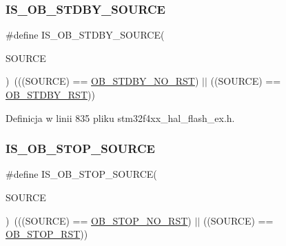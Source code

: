 \subsubsection{\texorpdfstring{I\+S\+\_\+\+O\+B\+\_\+\+S\+T\+D\+B\+Y\+\_\+\+S\+O\+U\+R\+CE}{IS\_OB\_STDBY\_SOURCE}}
{\footnotesize\ttfamily \#define I\+S\+\_\+\+O\+B\+\_\+\+S\+T\+D\+B\+Y\+\_\+\+S\+O\+U\+R\+CE(\begin{DoxyParamCaption}\item[{}]{S\+O\+U\+R\+CE }\end{DoxyParamCaption})~(((S\+O\+U\+R\+CE) == \hyperlink{group___f_l_a_s_h_ex___option___bytes__n_r_s_t___s_t_d_b_y_gad776ed7b3b9a98013aac9976eedb7e94}{O\+B\+\_\+\+S\+T\+D\+B\+Y\+\_\+\+N\+O\+\_\+\+R\+ST}) $\vert$$\vert$ ((S\+O\+U\+R\+CE) == \hyperlink{group___f_l_a_s_h_ex___option___bytes__n_r_s_t___s_t_d_b_y_ga69451a6f69247528f58735c9c83499ce}{O\+B\+\_\+\+S\+T\+D\+B\+Y\+\_\+\+R\+ST}))}



Definicja w linii 835 pliku stm32f4xx\+\_\+hal\+\_\+flash\+\_\+ex.\+h.

\mbox{\label{group___f_l_a_s_h_ex___i_s___f_l_a_s_h___definitions_ga131ae3434f300c8317dd6b3b349c7cab}} 
\subsubsection{\texorpdfstring{I\+S\+\_\+\+O\+B\+\_\+\+S\+T\+O\+P\+\_\+\+S\+O\+U\+R\+CE}{IS\_OB\_STOP\_SOURCE}}
{\footnotesize\ttfamily \#define I\+S\+\_\+\+O\+B\+\_\+\+S\+T\+O\+P\+\_\+\+S\+O\+U\+R\+CE(\begin{DoxyParamCaption}\item[{}]{S\+O\+U\+R\+CE }\end{DoxyParamCaption})~(((S\+O\+U\+R\+CE) == \hyperlink{group___f_l_a_s_h_ex___option___bytes__n_r_s_t___s_t_o_p_ga7344fe0ec25c5eb2d11db7c855325436}{O\+B\+\_\+\+S\+T\+O\+P\+\_\+\+N\+O\+\_\+\+R\+ST}) $\vert$$\vert$ ((S\+O\+U\+R\+CE) == \hyperlink{group___f_l_a_s_h_ex___option___bytes__n_r_s_t___s_t_o_p_gaef92c03b1f279c532bfa13d3bb074b57}{O\+B\+\_\+\+S\+T\+O\+P\+\_\+\+R\+ST}))}



